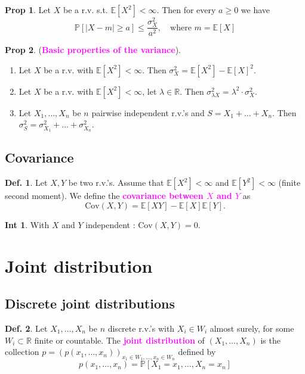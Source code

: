 \documentclass[8pt,a4paper,landscape]{article}
\theoremstyle{definition}
\newtheorem{definition}{Def.}[section]
\theoremstyle{example}
\theoremstyle{intuition}
\newtheorem*{intuition}{Int}
\theoremstyle{definition}
\newtheorem{proposition}{Prop}[section]
\newcommand{\mydef}[1]{\textcolor{magenta}{\textbf{#1}}}
\newcommand{\prob}[1]{\mathbb{P}\left[ #1 \right]}
\newcommand{\expec}[1]{\mathbb{E}\left[ #1 \right]}
\begin{document}
\begin{multicols}{3}
			\begin{proposition}
				Let $X$ be a r.v. s.t. $\expec{X^2} < \infty$. Then for every $a \geq 0$ we have 
				$$
					\prob{\lvert X - m\lvert \geq a} \leq \frac{\sigma^2_X}{a^2}, \quad \text{where } m = \expec{X}
				$$
			\end{proposition}

			\begin{proposition}
				(\mydef{Basic properties of the variance}).
				\begin{enumerate}
					\item Let $X$ be a r.v. with $\expec{X^2} < \infty$. Then $\sigma^2_X = \expec{X^2} - \expec{X}^2$.
					\item Let $X$ be a r.v. with $\expec{X^2} < \infty$, let $\lambda \in \mathbb{R}$. Then $\sigma^2_{\lambda X} = \lambda^2 \cdot \sigma^2_X$.
					\item Let $X_1, \ldots, X_n$ be $n$ pairwise independent r.v.'s and $S = X_1 + \ldots + X_n$. Then $\sigma^2_S = \sigma^2_{X_1} + \ldots + \sigma^2_{X_n}$.
				\end{enumerate}
			\end{proposition}


		\subsection{Covariance}
			\begin{definition}
				Let $X,Y$ be two r.v.'s. Assume that $\expec{X^2} < \infty$ and $\expec{Y^2} < \infty$ (finite second moment). We define the \mydef{covariance between $X$ and $Y$} as 
				$$
					\text{Cov}(X,Y) = \expec{XY} - \expec{X}\expec{Y}.
				$$
			\end{definition}

			\begin{intuition}
				With $X$ and $Y$ independent : $\text{Cov}(X,Y) = 0$.
			\end{intuition}

	
	\section{Joint distribution}
		\subsection{Discrete joint distributions}
			\begin{definition}
				Let $X_1, \ldots, X_n$ be $n$ discrete r.v.'s with $X_i \in W_i$ almost surely, for some $W_i \subset \mathbb{R}$ finite or countable. The \mydef{joint distribution} of $(X_1, \ldots, X_n)$ is the collection $p = (p(x_1, \ldots, x_n))_{x_1 \in W_1, \ldots, x_n \in W_n}$ defined by
				$$
					p(x_1, \ldots, x_n) = \prob{X_1 = x_1, \ldots, X_n = x_n}
				$$
			\end{definition}


\end{multicols}
\end{document}

